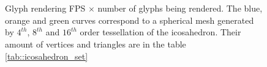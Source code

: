 \documentclass[twoside,twocolumn,10pt]{article}
\begin{document}
\begin{figure}[ht]
\centering
\captionsetup[subfloat]{farskip=0pt,nearskip=0pt}
    \\
    \\
     \caption{Glyph rendering FPS $\times$ number of glyphs being rendered. The blue, orange and green curves correspond to a spherical mesh  generated by $4^{th}$, $8^{th}$ and $16^{th}$ order tessellation of the icosahedron. Their amount of vertices and triangles are in the table \ref{tab::icosahedron_set}} %
    \label{fig::benchmark}
\end{figure}
\end{document}
